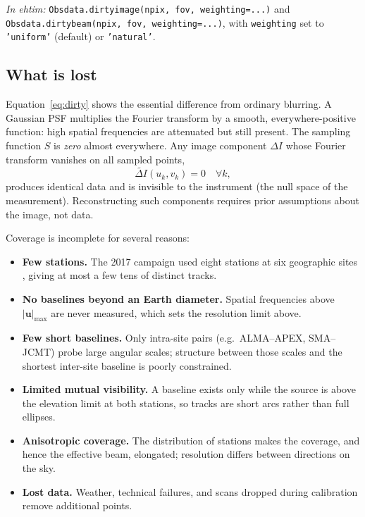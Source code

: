 \documentclass[11pt]{article}
\newcommand{\ehtimnote}[1]{%
  \par\smallskip\noindent
  \colorbox{gray!12}{\parbox{\dimexpr\linewidth-2\fboxsep}{\small\textit{In ehtim:} #1}}%
  \par\smallskip}
\begin{document}
\ehtimnote{\texttt{Obsdata.dirtyimage(npix, fov, weighting=...)} and
\texttt{Obsdata.dirtybeam(npix, fov, weighting=...)}, with
\texttt{weighting} set to \texttt{'uniform'} (default) or \texttt{'natural'}.}

\subsection{What is lost}

Equation~\eqref{eq:dirty} shows the essential difference from ordinary
blurring. A Gaussian PSF multiplies the Fourier transform by a smooth,
everywhere-positive function: high spatial frequencies are attenuated but
still present. The sampling function $S$ is \emph{zero} almost everywhere.
Any image component $\Delta I$ whose Fourier transform vanishes on all sampled
points,
\begin{equation}
\widetilde{\Delta I}(u_k, v_k) = 0 \quad \forall k,
\end{equation}
produces identical data and is invisible to the instrument (the null space of
the measurement). Reconstructing such components requires prior assumptions
about the image, not data.

Coverage is incomplete for several reasons:
\begin{itemize}
  \item \textbf{Few stations.} The 2017 campaign used eight stations at six
        geographic sites \cite{EHT2019II}, giving at most a few tens of
        distinct tracks.
  \item \textbf{No baselines beyond an Earth diameter.} Spatial frequencies
        above $|\mathbf{u}|_{\max}$ are never measured, which sets the
        resolution limit above.
  \item \textbf{Few short baselines.} Only intra-site pairs (e.g.\ ALMA--APEX,
        SMA--JCMT) probe large angular scales; structure between those scales
        and the shortest inter-site baseline is poorly constrained.
  \item \textbf{Limited mutual visibility.} A baseline exists only while the
        source is above the elevation limit at both stations, so tracks are
        short arcs rather than full ellipses.
  \item \textbf{Anisotropic coverage.} The distribution of stations makes
        the coverage, and hence the effective beam, elongated; resolution
        differs between directions on the sky.
  \item \textbf{Lost data.} Weather, technical failures, and scans dropped
        during calibration remove additional points.
\end{itemize}
\end{document}
